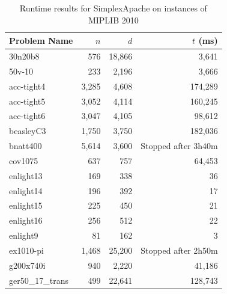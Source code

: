 \documentclass[nocopyrightspace]{acm_proc_article-sp}
\begin{document}
\appendix
\begin{table}[h!]
\label{tab:miplibresults}
\caption{Runtime results for SimplexApache on instances of MIPLIB 2010 \cite{KochEtAl2011}}
\begin{tabularx}{\columnwidth}{|X|r|r|r|}
\hline
Problem Name     & $n$  & $d$   & $t$ (ms) \\ \hline
30n20b8          & 576  & 18,866 & 3,641   \\ \hline
50v-10           & 233  & 2,196  & 3,666   \\ \hline
acc-tight4       & 3,285 & 4,608  & 174,289 \\ \hline
acc-tight5       & 3,052 & 4,114  & 160,245 \\ \hline
acc-tight6       & 3,047 & 4,105  & 98,612  \\ \hline
beasleyC3        & 1,750 & 3,750  & 182,036 \\ \hline
bnatt400         & 5,614 & 3,600 & Stopped after 3h40m \\ \hline
cov1075          & 637  & 757   & 64,453  \\ \hline
enlight13        & 169  & 338   & 36     \\ \hline
enlight14        & 196  & 392   & 17     \\ \hline
enlight15        & 225  & 450   & 21     \\ \hline
enlight16        & 256  & 512   & 22     \\ \hline
enlight9         & 81   & 162   & 3      \\ \hline
ex1010-pi		 & 1,468 & 25,200 & Stopped after 2h50m \\ \hline
g200x740i        & 940  & 2,220  & 41,186  \\ \hline
ger50\_17\_trans & 499  & 22,641 & 128,743 \\ \hline
\end{tabularx}
\end{table}
\end{document}
